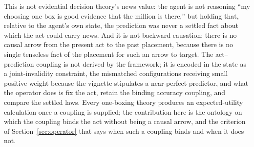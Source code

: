 This is not evidential decision theory's news value: the agent is not reasoning ``my choosing one box is good evidence that the million is there,'' but holding that, relative to the agent's own state, the prediction was never a settled fact about which the act could carry news. And it is not backward causation: there is no causal arrow from the present act to the past placement, because there is no single tenseless fact of the placement for such an arrow to target. The act--prediction coupling is not derived by the framework; it is encoded in the state as a joint-invalidity constraint, the mismatched configurations receiving small positive weight because the vignette stipulates a near-perfect predictor, and what the operator does is fix the act, retain the binding accuracy coupling, and compare the settled laws. Every one-boxing theory produces an expected-utility calculation once a coupling is supplied; the contribution here is the ontology on which the coupling binds the act without being a causal arrow, and the criterion of Section~\ref{sec:operator} that says when such a coupling binds and when it does not.

